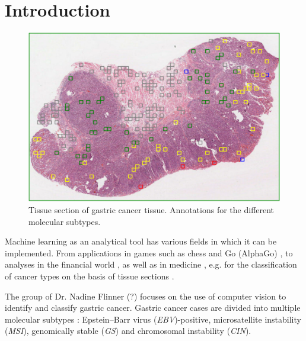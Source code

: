 \documentclass[a4paper,11pt]{scrartcl}
\theoremstyle{definition}
\begin{document}
\section{Introduction}
\begin{figure}[h]
	\centering
	\begin{center}
		\includegraphics[width=.9\textwidth]{Image_Intro/PastedGraphic-2.pdf}%
		\caption[Annotated gastric cancer tissue section]{Tissue section of gastric cancer tissue. Annotations for the different molecular subtypes.}%
		\label{fig:magenkarzinom_nadine}
	\end{center}
\end{figure}

Machine learning as an analytical tool has various fields in which it can be implemented.
From applications in games such as chess \cite{lai2015giraffe} and Go (AlphaGo) \cite{wu2007scalable}, to analyses in the financial world \cite{dixon2020machine}, as well as in medicine \cite{deo2015machine}, e.g. for the classification of cancer types on the basis of tissue sections \cite{amrane2018breast}.

The group of Dr. Nadine Flinner (?) focuses on the use of computer vision to identify and classify gastric cancer.
Gastric cancer cases are divided into multiple molecular subtypes \cite{bass2014comprehensive}: Epstein–Barr virus (\emph{EBV})-positive, microsatellite instability (\emph{MSI}), genomically stable (\emph{GS}) and chromosomal instability (\emph{CIN}).
\end{document}
